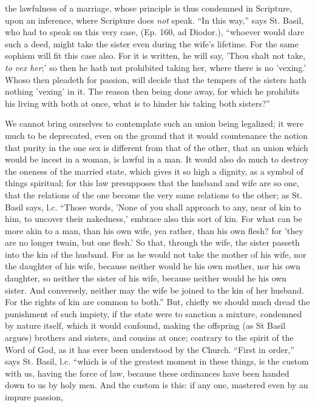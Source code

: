 the lawfulness of a marriage, whose principle is thus condemned in
Scripture, upon an inference, where Scripture does \emph{not} speak. ``In
this way,'' says St. Basil, who had to speak on this very case, (Ep. 160,
ad Diodor.), ``whoever would dare such a deed, might take the sister even
during the wife's lifetime. For the same sophism will fit this case
also. For it is written, he will say, 'Thou shalt not take, \emph{to vex
her};' so then he hath not prohibited taking her, where there is no 'vexing.'
Whoso then pleadeth for passion, will decide that the tempers of the
sisters hath nothing 'vexing' in it. The reason then being done away,
for which he prohibits his living with both at once, what is to hinder
his taking both sisters?''

We cannot bring ourselves to contemplate such an
union being legalized; it were much to be deprecated, even on the ground
that it would countenance the notion that purity in the one sex is
different from that of the other, that an union which would be incest in
a woman, is lawful in a man. It would also do much to destroy the
oneness of the married state, which gives it so high a dignity, as a
symbol of things spiritual; for this law presupposes that the husband
and wife are so one, that the relations of the one become the very same
relations to the other; as St. Basil says, l.c. ``Those words, 'None of
you shall approach to any, near of kin to him, to uncover their
nakedness,' embrace also this sort of kin. For what can be more akin to
a man, than his own wife, yea rather, than his own flesh? for 'they are
no longer twain, but one flesh.' So that, through the wife, the sister
passeth into the kin of the husband. For as he would not take the mother
of his wife, nor the daughter of his wife, because neither would he his
own mother, nor his own daughter, so neither the sister of his wife,
because neither would he his own sister. And conversely, neither may the
wife be joined to the kin of her husband. For the rights of kin are
common to both.'' But, chiefly we should much dread the punishment of
such impiety, if the state were to sanction a mixture, condemned by
nature itself, which it would confound, making the offspring (as St
Basil argues) brothers and sisters, and cousins at once; contrary to the
spirit of the Word of God, as it has ever been understood by the Church.
``First in order,'' says St. Basil, l.c. ``which is of the greatest moment
in these things, is the custom with us, having the force of law,
because these ordinances have been handed down to us by holy men. And
the custom is this: if any one, mastered even by an impure passion,
